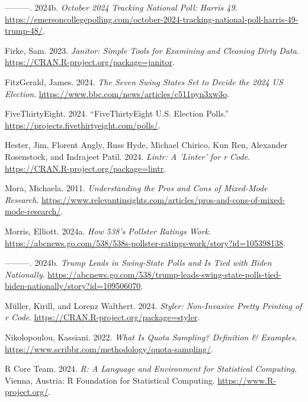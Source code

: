 \documentclass[
  letterpaper,
  DIV=11,
  numbers=noendperiod]{scrartcl}
\newlength{\cslhangindent}
\newlength{\cslentryspacingunit} %
\newenvironment{CSLReferences}[2] %
 {%
  \setlength{\parindent}{0pt}
  \ifodd #1
  \let\oldpar\par
  \def\par{\hangindent=\cslhangindent\oldpar}
  \fi
  \setlength{\parskip}{#2\cslentryspacingunit}
 }%
 {}
\begin{document}
\begin{CSLReferences}{1}{0}
\leavevmode{}%
---------. 2024b. \emph{October 2024 Tracking National Poll: Harris 49}.
\url{https://emersoncollegepolling.com/october-2024-tracking-national-poll-harris-49-trump-48/}.

\leavevmode{}%
Firke, Sam. 2023. \emph{Janitor: Simple Tools for Examining and Cleaning
Dirty Data}. \url{https://CRAN.R-project.org/package=janitor}.

\leavevmode{}%
FitzGerald, James. 2024. \emph{The Seven Swing States Set to Decide the
2024 US Election}. \url{https://www.bbc.com/news/articles/c511pyn3xw3o}.

\leavevmode{}%
FiveThirtyEight. 2024. {``{FiveThirtyEight U.S. Election Polls}.''}
\url{https://projects.fivethirtyeight.com/polls/}.

\leavevmode{}%
Hester, Jim, Florent Angly, Russ Hyde, Michael Chirico, Kun Ren,
Alexander Rosenstock, and Indrajeet Patil. 2024. \emph{Lintr: A 'Linter'
for r Code}. \url{https://CRAN.R-project.org/package=lintr}.

\leavevmode{}%
Mora, Michaela. 2011. \emph{Understanding the Pros and Cons of
Mixed-Mode Research}.
\url{https://www.relevantinsights.com/articles/pros-and-cons-of-mixed-mode-research/}.

\leavevmode{}%
Morris, Elliott. 2024a. \emph{How 538's Pollster Ratings Work}.
\url{https://abcnews.go.com/538/538s-pollster-ratings-work/story?id=105398138}.

\leavevmode{}%
---------. 2024b. \emph{Trump Leads in Swing-State Polls and Is Tied
with Biden Nationally}.
\url{https://abcnews.go.com/538/trump-leads-swing-state-polls-tied-biden-nationally/story?id=109506070}.

\leavevmode{}%
Müller, Kirill, and Lorenz Walthert. 2024. \emph{Styler: Non-Invasive
Pretty Printing of r Code}.
\url{https://CRAN.R-project.org/package=styler}.

\leavevmode{}%
Nikolopoulou, Kassiani. 2022. \emph{What Is Quota Sampling? \textbar{}
Definition \& Examples}.
\url{https://www.scribbr.com/methodology/quota-sampling/}.

\leavevmode{}%
R Core Team. 2024. \emph{R: A Language and Environment for Statistical
Computing}. Vienna, Austria: R Foundation for Statistical Computing.
\url{https://www.R-project.org/}.


\end{CSLReferences}
\end{document}
